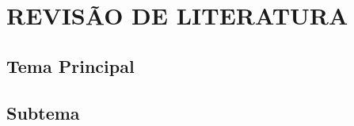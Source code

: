 \chapter{REVISÃO DE LITERATURA}
\label{cap:revisao}

%

\section{Tema Principal}


\section{Subtema}

